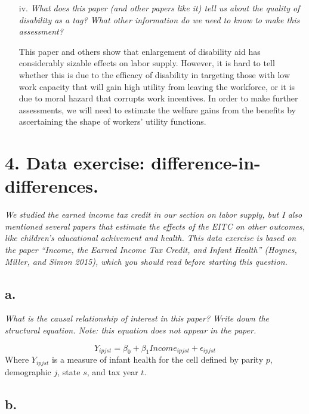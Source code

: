 \documentclass[
]{article}
\begin{document}
\begin{enumerate}
\item[iv.] \textit{What does this paper (and other papers like it) tell us about the quality of disability as a tag? What other information do we need to know to make this assessment?}  
  
This paper and others show that enlargement of disability aid has considerably sizable effects on labor supply. However, it is hard to tell whether this is due to the efficacy of disability in targeting those with low work capacity that will gain high utility from leaving the workforce, or it is due to moral hazard that corrupts work incentives. In order to make further assessments, we will need to estimate the welfare gains from the benefits by ascertaining the shape of workers' utility functions. 


\end{enumerate}

\hypertarget{data-exercise-difference-in-differences.}{%
\section{4. Data exercise:
difference-in-differences.}\label{data-exercise-difference-in-differences.}}

\textit{We studied the earned income tax credit in our section on labor supply, but I also mentioned several papers that estimate the effects of the EITC on other outcomes, like children’s educational achivement and health. This data exercise is based on the paper “Income, the Earned Income Tax Credit, and Infant Health” (Hoynes, Miller, and Simon 2015), which you should read before starting this question.}

\hypertarget{a.-3}{%
\subsection{a.}\label{a.-3}}

\textit{What is the causal relationship of interest in this paper? Write down the structural equation. Note: this equation does not appear in the paper.}

\[Y_{ipjst} = \beta_0 + \beta_1 Income _{ipjst} + \epsilon_{ipjst} \]
Where \(Y_{ipjst}\) is a measure of infant health for the cell defined
by parity \(p\), demographic \(j\), state \(s\), and tax year \(t\).

\hypertarget{b.-3}{%
\subsection{b.}\label{b.-3}}
\end{document}
